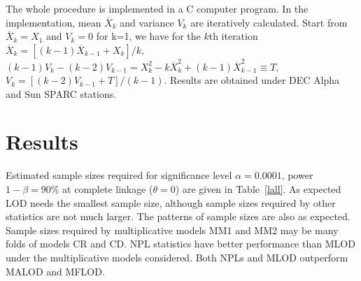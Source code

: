 The whole procedure is implemented in a C computer program.  In the
implementation, mean $\overline X_k$ and variance $V_k$ are iteratively
calculated.  Start from $\overline X_k=X_1$ and $V_k=0$ for k=1, we have for
the $k$th iteration $\overline X_k={[(k-1)\overline X_{k-1}+X_k]}/{k}$,
$(k-1)V_k-(k-2)V_{k-1} = {X_k^2-k\overline X_k^2+(k-1)\overline
X_{k-1}^2}\equiv T$, $V_k=[(k-2)V_{k-1}+T]/{(k-1)}$.  Results are obtained
under DEC Alpha and Sun SPARC stations.


\section{Results}

Estimated sample sizes required for significance level $\alpha=0.0001$,
power $1-\beta=90\%$ at complete linkage ($\theta=0$) are given in
Table~\ref{lall}. As expected LOD needs the smallest sample size, although
sample sizes required by other statistics are not much larger.  The
patterns of sample sizes are also as expected.  Sample sizes required by
multiplicative models MM1 and MM2 may be many folds of models CR and CD.  
NPL statistics have better performance than MLOD under the multiplicative
models considered.  Both NPLs and MLOD outperform MALOD and MFLOD.

